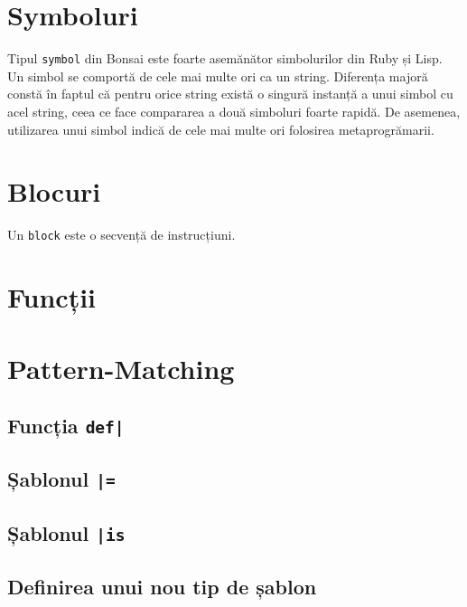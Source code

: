 \documentclass[12pt,a4paper]{memoir}
\begin{document}
\section{Symboluri}

Tipul \texttt{symbol} din Bonsai este foarte asemănător simbolurilor din Ruby\cite{ruby_symbols} și Lisp\cite{clhs_symbols}. Un simbol se comportă de cele mai multe ori ca un string. Diferența majoră constă în faptul că pentru orice string există o singură instanță a unui simbol cu acel string, ceea ce face compararea a două simboluri foarte rapidă. De asemenea, utilizarea unui simbol indică de cele mai multe ori folosirea metaprogrămarii.

\section{Blocuri}

Un \texttt{block} este o secvență de instrucțiuni.


\section{Funcții}


\section{Pattern-Matching}

\subsection{Funcția \texttt{def|}}

\subsection{Șablonul \texttt{|=}}

\subsection{Șablonul \texttt{|is}}


\subsection{Definirea unui nou tip de șablon}
\end{document}
